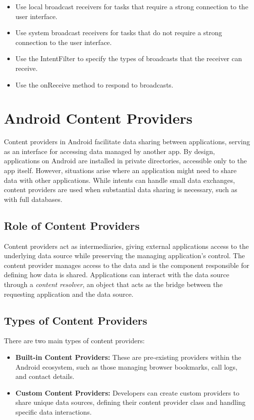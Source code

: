 \documentclass{article}
\begin{document}
\begin{itemize}
\item Use local broadcast receivers for tasks that require a strong connection to the user interface.
\item Use system broadcast receivers for tasks that do not require a strong connection to the user interface.
\item Use the IntentFilter to specify the types of broadcasts that the receiver can receive.
\item Use the onReceive method to respond to broadcasts.
\end{itemize}
\section{Android Content Providers}
Content providers in Android facilitate data sharing between applications, serving as an interface for accessing data managed by another app. By design, applications on Android are installed in private directories, accessible only to the app itself. However, situations arise where an application might need to share data with other applications. While intents can handle small data exchanges, content providers are used when substantial data sharing is necessary, such as with full databases.

\subsection{Role of Content Providers}
Content providers act as intermediaries, giving external applications access to the underlying data source while preserving the managing application's control. The content provider manages access to the data and is the component responsible for defining how data is shared. Applications can interact with the data source through a \textit{content resolver}, an object that acts as the bridge between the requesting application and the data source.

\subsection{Types of Content Providers}
There are two main types of content providers:
\begin{itemize}
    \item \textbf{Built-in Content Providers:} These are pre-existing providers within the Android ecosystem, such as those managing browser bookmarks, call logs, and contact details.
    \item \textbf{Custom Content Providers:} Developers can create custom providers to share unique data sources, defining their content provider class and handling specific data interactions.
\end{itemize}
\end{document}

